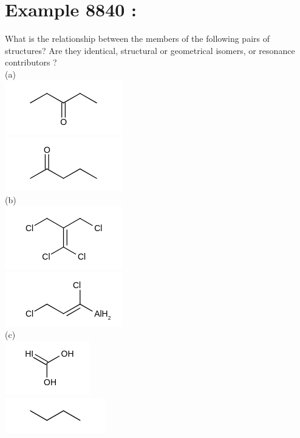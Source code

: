 \documentclass[10pt]{article}
\begin{document}
\section*{Example 8840 :}
What is the relationship between the members of the following pairs of structures? Are they identical, structural or geometrical isomers, or resonance contributors ?\\
(a)\\
\includegraphics{smile-9f63e02e511204210c5ceef0c335da5e1595f626}\\
\includegraphics{smile-a23d43055bb99f2bf47c85be4cefec9612ce1197}\\
(b)\\
\includegraphics{smile-93cda3fbbddf9ed60b9f0ee566ddf84ac3be3530}\\
\includegraphics{smile-974375e78cc9d1bf3858c397078a1f934c6c34b0}\\
(c)\\
\includegraphics{smile-8746de1df4964f6d8a293c0558ca2042ca7e3fae}\\
\includegraphics{smile-557ba72882d8d470bdc16a0a503f3a21c6811a77}\\
\end{document}
